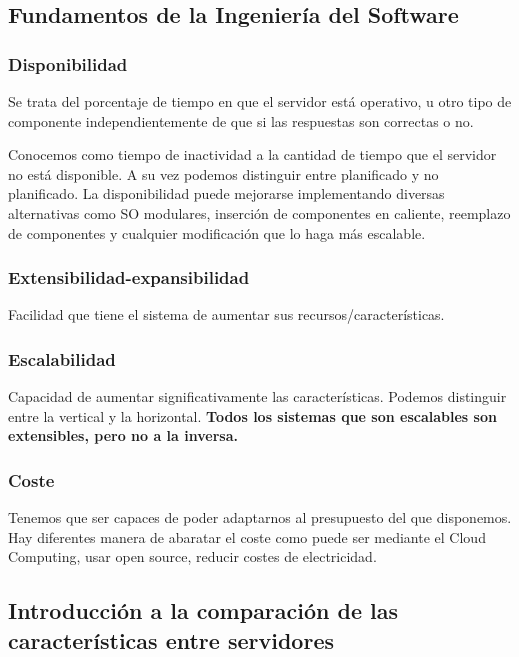 \subsection{Fundamentos de la Ingeniería del Software}


\subsubsection{Disponibilidad}

Se trata del porcentaje de tiempo en que el servidor está operativo, u otro tipo de componente independientemente de que si las respuestas son correctas o no.

Conocemos como tiempo de inactividad a la cantidad de tiempo que el servidor no está disponible. A su vez podemos distinguir entre planificado y no planificado. La disponibilidad puede mejorarse implementando diversas alternativas como SO modulares, inserción de componentes en caliente, reemplazo de componentes y cualquier modificación que lo haga más escalable.

\subsubsection{Extensibilidad-expansibilidad}

Facilidad que tiene el sistema de aumentar sus recursos/características.

\subsubsection{Escalabilidad}

Capacidad de aumentar significativamente las características. Podemos distinguir entre la vertical y la horizontal. \textbf{Todos los sistemas que son escalables son extensibles, pero no a la inversa.}

\subsubsection{Coste}

Tenemos que ser capaces de poder adaptarnos al presupuesto del que disponemos. Hay diferentes manera de abaratar el coste como puede ser mediante el Cloud Computing, usar open source, reducir costes de electricidad.

\subsection{Introducción a la comparación de las características entre servidores}

